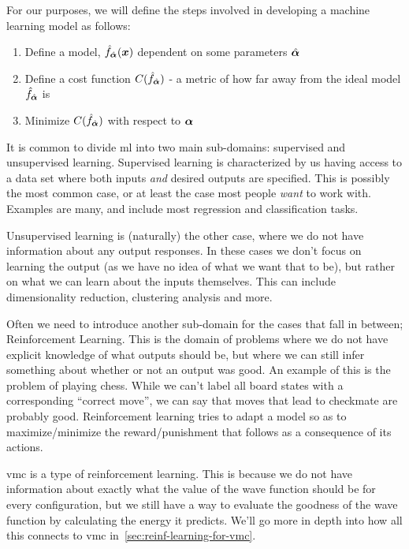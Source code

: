 \documentclass[Thesis.tex]{subfiles}
\begin{document}
For our purposes, we will define the steps involved in developing a machine
learning model as follows:

\begin{enumerate}
  \item Define a model, $\hat f_{\hat{\bm{\alpha}}}(\bm{x})$ dependent on some parameters $\hat{\bm{\alpha}}$
  \item Define a cost function $C(\hat f_{\hat{\bm{\alpha}}})$ - a metric of how far away from the
      ideal model $\hat f_{\hat{\bm{\alpha}}}$ is
  \item Minimize $C(\hat f_{\hat{\bm{\alpha}}})$ with respect to $\bm{\alpha}$
\end{enumerate}

It is common to divide \gls{ml} into two main sub-domains: supervised and unsupervised
learning. Supervised learning is characterized by us having access to a data set
where both inputs \emph{and} desired outputs are specified. This is possibly the
most common case, or at least the case most people \emph{want} to work with.
Examples are many, and include most regression and classification tasks.

Unsupervised learning is (naturally) the other case, where we do not have
information about any output responses. In these cases we don't focus on
learning the output (as we have no idea of what we want that to be), but rather
on what we can learn about the inputs themselves. This can include
dimensionality reduction, clustering analysis and more.

Often we need to introduce another sub-domain for the cases that fall in
between; Reinforcement Learning. This is the domain of problems where we do not
have explicit knowledge of what outputs should be, but where we can still infer
something about whether or not an output was good. An example of this is the
problem of playing chess. While we can't label all board states with a
corresponding ``correct move'', we can say that moves that lead to
checkmate are probably good. Reinforcement learning tries to adapt a model so as
to maximize/minimize the reward/punishment that follows as a consequence of its
actions.

\Gls{vmc} is a type of reinforcement learning. This is because we
do not have information about exactly what the value of the wave function should
be for every configuration, but we still have a way to evaluate the goodness
of the wave function by calculating the energy it predicts. We'll go more in
depth into how all this connects to \gls{vmc} in~\cref{sec:reinf-learning-for-vmc}.
\end{document}
